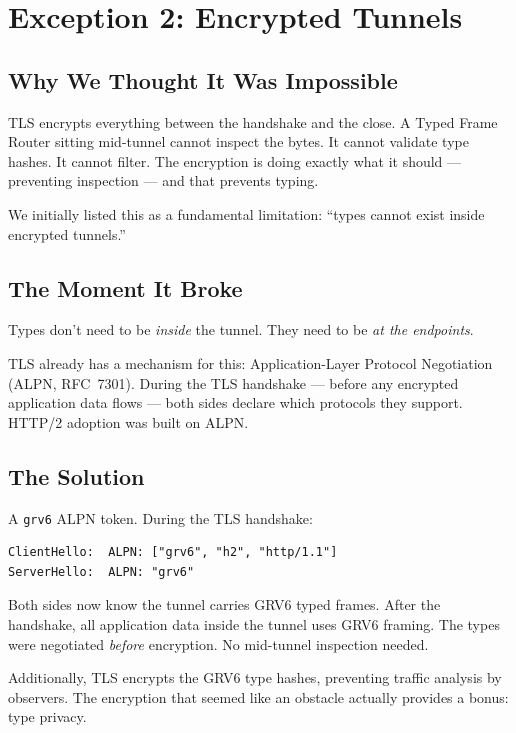 \documentclass[11pt,a4paper]{article}
\begin{document}
\section{Exception 2: Encrypted Tunnels}
\label{sec:encryption}

\subsection{Why We Thought It Was Impossible}

TLS encrypts everything between the handshake and the close. A Typed
Frame Router sitting mid-tunnel cannot inspect the bytes. It cannot
validate type hashes. It cannot filter. The encryption is doing exactly
what it should --- preventing inspection --- and that prevents typing.

We initially listed this as a fundamental limitation: ``types cannot
exist inside encrypted tunnels.''

\subsection{The Moment It Broke}

Types don't need to be \emph{inside} the tunnel. They need to be
\emph{at the endpoints}.

TLS already has a mechanism for this: Application-Layer Protocol
Negotiation (ALPN, RFC~7301). During the TLS handshake --- before any
encrypted application data flows --- both sides declare which protocols
they support. HTTP/2 adoption was built on ALPN.

\subsection{The Solution}

A \texttt{grv6} ALPN token. During the TLS handshake:

\begin{lstlisting}
ClientHello:  ALPN: ["grv6", "h2", "http/1.1"]
ServerHello:  ALPN: "grv6"
\end{lstlisting}

Both sides now know the tunnel carries GRV6 typed frames. After the
handshake, all application data inside the tunnel uses GRV6 framing.
The types were negotiated \emph{before} encryption. No mid-tunnel
inspection needed.

Additionally, TLS encrypts the GRV6 type hashes, preventing traffic
analysis by observers. The encryption that seemed like an obstacle
actually provides a bonus: type privacy.
\end{document}
